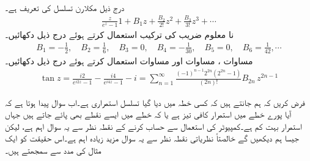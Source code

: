 \quad {}\\
درج ذیل مکلارن تسلسل   کی تعریف ہے۔
\begin{align}\label{مساوات_ٹیلر_برنولی_اعداد_تعریف}
\tfrac{z}{e^z-1}1+B_1z+\tfrac{B_2}{2!}z^2+\tfrac{B_3}{3!}z^3+\cdots
\end{align}
نا معلوم  ضریب  کی ترکیب استعمال کرتے ہوئے درج ذیل دکھائیں۔
\begin{align}\label{مساوات_ٹیلر_برنولی_اعداد}
B_1=-\tfrac{1}{2},\quad B_2=\tfrac{1}{6},\quad B_3=0,\quad B_4=-\tfrac{1}{30},\quad B_5=0,\quad B_6=\tfrac{1}{42},\cdots
\end{align} 
\quad
مساوات ، مساوات  اور مساوات  استعمال کرتے ہوئے درج ذیل دکھائیں۔
\begin{align}
\tan z=\tfrac{i2}{e^{i2z}-1}-\tfrac{i4}{e^{i4z}-1}-i=\sum\limits_{n=1}^{\infty}  \tfrac{(-1)^{n-1}2^{2n} (2^{2n}-1)}{(2n)!} B_{2n} \, z^{2n-1}
\end{align}

فرض کریں کہ ہم جانتے ہیں کہ کسی خطہ  میں دیا گیا تسلسل استمراری ہے۔اب سوال پیدا ہوتا ہے کہ آیا پورے خطے میں استمرار کافی تیز ہے یا کہ خطے میں ایسے نقطے بھی پائے جاتے ہیں جہاں استمرار بہت کم  ہے۔کمپیوٹر کی استعمال سے حساب کرنے کے نقطہ نظر سے یہ سوال اہم ہے، لیکن جیسا ہم دیکھیں گے  خالصتاً نظریاتی نقطہ نظر سے یہ سوال مزید زیادہ اہم ہے۔اس حقیقت کو ایک مثال کی مدد سے سمجھتے ہیں۔

